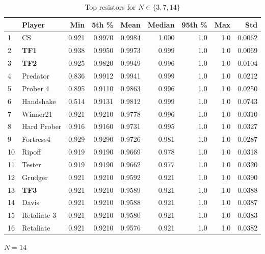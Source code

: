\documentclass[10pt,letterpaper]{article}
\begin{document}
\begin{table}[!hbtp]
    \begin{subfigure}[t]{\columnwidth}
        \centering
        \begin{tabular}{llrrrrrrr}
        \toprule
        {} &       Player &    Min &   5th \% &    Mean &  Median &  95th \% &  Max &     Std \\
        \midrule
        1  &           CS &  0.921 &  0.9970 &  0.9984 &   1.000 &     1.0 &  1.0 &  0.0062 \\
        2  &          \textbf{TF1} &  0.938 &  0.9950 &  0.9973 &   0.999 &     1.0 &  1.0 &  0.0069 \\
        3  &          \textbf{TF2} &  0.925 &  0.9820 &  0.9949 &   0.996 &     1.0 &  1.0 &  0.0104 \\
        4  &     Predator &  0.836 &  0.9912 &  0.9941 &   0.999 &     1.0 &  1.0 &  0.0212 \\
        5  &     Prober 4 &  0.895 &  0.9110 &  0.9863 &   0.996 &     1.0 &  1.0 &  0.0250 \\
        6  &    Handshake &  0.514 &  0.9131 &  0.9812 &   0.999 &     1.0 &  1.0 &  0.0743 \\
        7  &     Winner21 &  0.921 &  0.9210 &  0.9778 &   0.996 &     1.0 &  1.0 &  0.0310 \\
        8  &  Hard Prober &  0.916 &  0.9160 &  0.9731 &   0.995 &     1.0 &  1.0 &  0.0327 \\
        9  &    Fortress4 &  0.929 &  0.9290 &  0.9726 &   0.981 &     1.0 &  1.0 &  0.0287 \\
        10 &       Ripoff &  0.919 &  0.9190 &  0.9669 &   0.978 &     1.0 &  1.0 &  0.0318 \\
        11 &       Tester &  0.919 &  0.9190 &  0.9662 &   0.977 &     1.0 &  1.0 &  0.0320 \\
        12 &      Grudger &  0.921 &  0.9210 &  0.9592 &   0.921 &     1.0 &  1.0 &  0.0390 \\
        13 &          \textbf{TF3} &  0.921 &  0.9210 &  0.9589 &   0.921 &     1.0 &  1.0 &  0.0388 \\
        14 &        Davis &  0.921 &  0.9210 &  0.9588 &   0.921 &     1.0 &  1.0 &  0.0387 \\
        15 &  Retaliate 3 &  0.921 &  0.9210 &  0.9580 &   0.921 &     1.0 &  1.0 &  0.0383 \\
        16 &    Retaliate &  0.921 &  0.9210 &  0.9576 &   0.921 &     1.0 &  1.0 &  0.0382 \\
        \bottomrule
        \end{tabular}
        \caption{\(N=14\)}
    \end{subfigure}
    \caption{Top resistors for \(N\in\{3, 7, 14\}\)}
    \label{tbl:top_resist}
\end{table}
\end{document}
